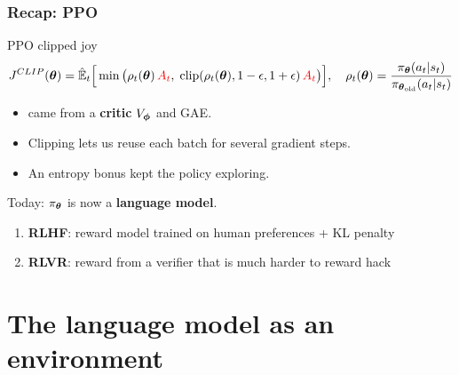 \begin{frame}
    \frametitle{Recap: PPO}
    \begin{block}{PPO clipped joy}
        \vspace{-0.3cm}
        $$
        J^{CLIP}({\boldsymbol{\theta}}) = \hat{\mathbb{E}}_t\Big[\min\big(\rho_t({\boldsymbol{\theta}})\,\textcolor{red}{A_t},\;
        \text{clip}(\rho_t({\boldsymbol{\theta}}), 1-\epsilon, 1+\epsilon)\,\textcolor{red}{A_t}\big)\Big],
        \quad
        \rho_t({\boldsymbol{\theta}}) = \frac{\pi_{\boldsymbol{\theta}}(a_t|s_t)}{\pi_{{\boldsymbol{\theta}}_{\text{old}}}(a_t|s_t)}
        $$
    \end{block}
    \begin{itemize}
        \item {} came from a \textbf{critic} $V_{\boldsymbol{\phi}}$ and GAE.
        \item Clipping lets us reuse each batch for several gradient steps.
        \item An entropy bonus kept the policy exploring.
    \end{itemize}
    \pause
    \vspace{0.3cm}
    Today: $\pi_{\boldsymbol{\theta}}$ is now a \textbf{language model}.
    \begin{enumerate}
        \item \textbf{RLHF}: reward model trained on human preferences + KL penalty
        \item \textbf{RLVR}: reward from a verifier that is much harder to reward hack
    \end{enumerate}
\end{frame}

\section{The language model as an environment}

